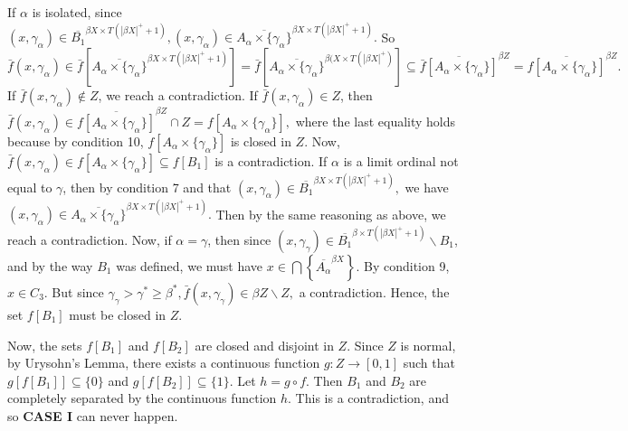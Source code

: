 \documentclass{article}
\begin{document}
																																																				If $\alpha$ is isolated, since $(x,\gamma_\alpha)\in \overline{B_1}^{\beta X\times T(|\beta X|^+ +1)}, (x,\gamma_\alpha)\in \overline{A_\alpha\times \{\gamma_\alpha\}}^{\beta X \times T(|\beta X|^+ +1)}.$ So $\bar{f}(x,\gamma_\alpha)\in \bar{f}\left[\overline{A_\alpha\times \{\gamma_\alpha\}}^{\beta X\times T(|\beta X|^+ +1)}\right]=\bar{f} \left[\overline{A_\alpha\times \{\gamma_\alpha\}}^{\beta (X\times T(|\beta X|^+)}\right] \subseteq \overline{\bar{f}\left[A_\alpha\times \{\gamma_\alpha\}\right]}^{\beta Z}=\overline{f\left[A_\alpha\times \{\gamma_\alpha\}\right]}^{\beta Z}.$  If $\bar{f}(x,\gamma_\alpha)\notin Z$, we reach a contradiction. If $\bar{f}(x,\gamma_\alpha)\in Z$, then $\bar{f}(x,\gamma_\alpha)\in
																																																					\overline{f\left[A_\alpha\times \{\gamma_\alpha\}\right]}^{\beta Z}\cap Z=f\left[A_\alpha \times \{\gamma_\alpha\}\right],$ where the last equality holds because by condition 10, $f\left[A_\alpha\times \{\gamma_\alpha\}\right]$ is closed in $Z$. Now, $\bar{f}(x,\gamma_\alpha)\in f\left[A_\alpha \times \{\gamma_\alpha\}\right]\subseteq f\left[B_1\right]$ is a contradiction.
																																																					\vskip 15pt
																																																					If $\alpha$ is a limit ordinal not equal to $\gamma$, then by condition 7 and that $(x,\gamma_\alpha)\in \overline{B_1}^{\beta X\times T(|\beta X|^+ +1)},$  we have $(x,\gamma_\alpha)\in \overline{A_\alpha\times \{\gamma_\alpha\}}^{\beta X \times T(|\beta X|^+ +1)}.$ Then by the same reasoning as above, we reach a contradiction.
																																																					\vskip 15pt
																																																					Now, if $\alpha=\gamma$, then since $(x,\gamma_\gamma) \in \overline{B_1}^{\beta \times T(|\beta X|^+ +1)}\backslash B_1$, and by the way $B_1$ was defined, we must have $x\in \bigcap \left\{\overline{A_\alpha}^{\beta X}\right\}$. By condition 9, $x\in C_3$. But since $\gamma_\gamma> \gamma^* \geq \beta^*, \bar{f}(x,\gamma_\gamma)\in \beta Z\backslash Z,$ a contradiction. Hence, the set $f[B_1]$ must be closed in $Z$.

																																																					\vskip 25pt

																																																					Now, the sets $f\left[B_1\right]$ and $f\left[B_2\right]$ are closed and disjoint in $Z$. Since $Z$ is normal, by Urysohn's Lemma, there exists a continuous function $g:Z\rightarrow [0,1]$ such that $g\left[ f\left[B_1\right]\right]\subseteq \{0\}$ and $g\left[f\left[B_2\right]\right]\subseteq \{1\}.$ Let $h=g\circ f.$ Then $B_1$ and $B_2$ are completely separated by the continuous function $h$. This is a contradiction, and so \textbf{CASE I} can never happen.  
\end{document}
